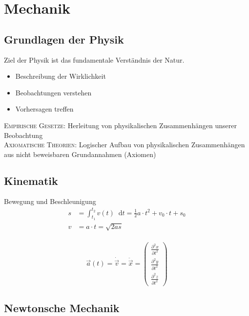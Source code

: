 \documentclass[a4paper,12pt]{report}
\newcommand*\diff{\mathop{}\!\mathrm{d}}
\begin{document}
\newpage
\chapter{Mechanik}


\section{Grundlagen der Physik}

Ziel der Physik ist das fundamentale Verständnis der Natur.\\

\begin{itemize}
\item Beschreibung der Wirklichkeit
\item Beobachtungen verstehen
\item Vorhersagen treffen
\end{itemize}

\textsc{Empirische Gesetze}: Herleitung von physikalischen Zusammenhängen unserer Beobachtung\\

\textsc{Axiomatische Theorien}: Logischer Aufbau von physikalischen Zusammenhängen aus nicht beweisbaren Grundannahmen (Axiomen) \\

\section{Kinematik}

Bewegung und Beschleunigung\\ 

\begin{align*}
s &= \int_{t_1}^{t_2}{v(t)  \diff t} = \frac{1}{2} a \cdot t^2 +  v_0 \cdot t + s_0 \\
v &= a \cdot t  = \sqrt{2 as} \\
\end{align*}

\begin{equation*}
\vec{a}(t) = \dot{\vec{v}}= \ddot{\vec{x}} =  
\begin{pmatrix} 
\frac{\partial^2 x}{{\partial t}^2} \\ 
\frac{\partial^2 y}{{\partial t}^2} \\  
\frac{\partial^2 z}{{\partial t}^2} 
\end{pmatrix} 
\end{equation*}


\section{Newtonsche Mechanik}
\end{document}
